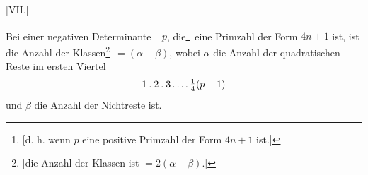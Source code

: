 \par\bigskip{}\centerline{[VII.]}\medskip
Bei einer negativen Determinante $-p$, die\begingroup\renewcommand{\thefootnote}{***)}\footnote{[d. h. wenn $p$ eine positive Primzahl der Form $4n+1$ ist.]}\endgroup\ eine Primzahl der Form $4n+1$ ist, ist die Anzahl der Klassen\begingroup\renewcommand{\thefootnote}{$\dagger$)}\footnote{[die Anzahl der Klassen ist $=2(\alpha-\beta)$.]}\endgroup\ $=(\alpha-\beta)$, wobei $\alpha$ die Anzahl der quadratischen Reste im ersten Viertel
\[
1\mathbin{.}2\mathbin{.}3\mathinner{.\,.\,.\,.}\tfrac14(p-1)
\]
und $\beta$ die Anzahl der Nichtreste ist.
